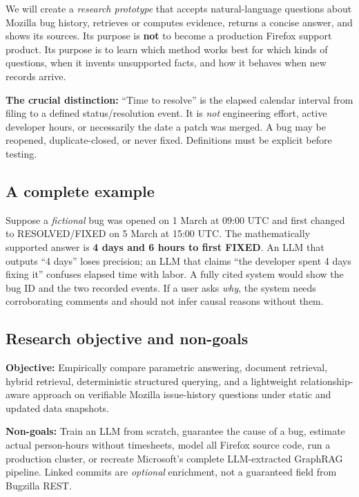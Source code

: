 \documentclass[11pt,a4paper]{article}
\begin{document}
We will create a \emph{research prototype} that accepts natural-language questions about Mozilla bug history, retrieves or computes evidence, returns a concise answer, and shows its sources. Its purpose is \textbf{not} to become a production Firefox support product. Its purpose is to learn which method works best for which kinds of questions, when it invents unsupported facts, and how it behaves when new records arrive.

\begin{keybox}
\textbf{The crucial distinction:} ``Time to resolve'' is the elapsed calendar interval from filing to a defined status/resolution event. It is \emph{not} engineering effort, active developer hours, or necessarily the date a patch was merged. A bug may be reopened, duplicate-closed, or never fixed. Definitions must be explicit before testing.
\end{keybox}

\subsection{A complete example}
Suppose a \emph{fictional} bug was opened on 1 March at 09:00 UTC and first changed to RESOLVED/FIXED on 5 March at 15:00 UTC. The mathematically supported answer is \textbf{4 days and 6 hours to first FIXED}. An LLM that outputs ``4 days'' loses precision; an LLM that claims ``the developer spent 4 days fixing it'' confuses elapsed time with labor. A fully cited system would show the bug ID and the two recorded events. If a user asks \emph{why}, the system needs corroborating comments and should not infer causal reasons without them.

\subsection{Research objective and non-goals}
\textbf{Objective:} Empirically compare parametric answering, document retrieval, hybrid retrieval, deterministic structured querying, and a lightweight relationship-aware approach on verifiable Mozilla issue-history questions under static and updated data snapshots.

\textbf{Non-goals:} Train an LLM from scratch, guarantee the cause of a bug, estimate actual person-hours without timesheets, model all Firefox source code, run a production cluster, or recreate Microsoft's complete LLM-extracted GraphRAG pipeline. Linked commits are \emph{optional} enrichment, not a guaranteed field from Bugzilla REST.
\end{document}
